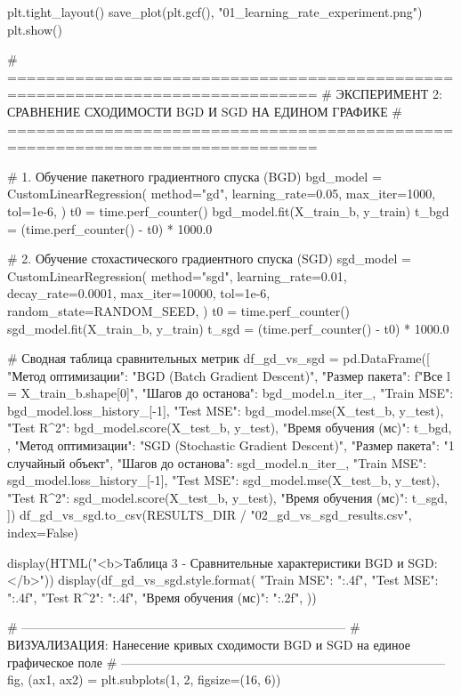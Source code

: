 \documentclass[14pt,a4paper]{extarticle}
\begin{document}
\begin{CodeListing}
plt.tight_layout()
save_plot(plt.gcf(), "01_learning_rate_experiment.png")
plt.show()

# ==============================================================================
# ЭКСПЕРИМЕНТ 2: СРАВНЕНИЕ СХОДИМОСТИ BGD И SGD НА ЕДИНОМ ГРАФИКЕ
# ==============================================================================

# 1. Обучение пакетного градиентного спуска (BGD)
bgd_model = CustomLinearRegression(
    method="gd",
    learning_rate=0.05,
    max_iter=1000,
    tol=1e-6,
)
t0 = time.perf_counter()
bgd_model.fit(X_train_b, y_train)
t_bgd = (time.perf_counter() - t0) * 1000.0

# 2. Обучение стохастического градиентного спуска (SGD)
sgd_model = CustomLinearRegression(
    method="sgd",
    learning_rate=0.01,
    decay_rate=0.0001,
    max_iter=10000,
    tol=1e-6,
    random_state=RANDOM_SEED,
)
t0 = time.perf_counter()
sgd_model.fit(X_train_b, y_train)
t_sgd = (time.perf_counter() - t0) * 1000.0

# Сводная таблица сравнительных метрик
df_gd_vs_sgd = pd.DataFrame([
    {
        "Метод оптимизации": "BGD (Batch Gradient Descent)",
        "Размер пакета": f"Все l = {X_train_b.shape[0]}",
        "Шагов до останова": bgd_model.n_iter_,
        "Train MSE": bgd_model.loss_history_[-1],
        "Test MSE": bgd_model.mse(X_test_b, y_test),
        "Test R^2": bgd_model.score(X_test_b, y_test),
        "Время обучения (мс)": t_bgd,
    },
    {
        "Метод оптимизации": "SGD (Stochastic Gradient Descent)",
        "Размер пакета": "1 случайный объект",
        "Шагов до останова": sgd_model.n_iter_,
        "Train MSE": sgd_model.loss_history_[-1],
        "Test MSE": sgd_model.mse(X_test_b, y_test),
        "Test R^2": sgd_model.score(X_test_b, y_test),
        "Время обучения (мс)": t_sgd,
    }
])
df_gd_vs_sgd.to_csv(RESULTS_DIR / "02_gd_vs_sgd_results.csv", index=False)

display(HTML("<b>Таблица 3 - Сравнительные характеристики BGD и SGD:</b>"))
display(df_gd_vs_sgd.style.format({
    "Train MSE": "{:.4f}",
    "Test MSE": "{:.4f}",
    "Test R^2": "{:.4f}",
    "Время обучения (мс)": "{:.2f}",
}))

# ------------------------------------------------------------------------------
# ВИЗУАЛИЗАЦИЯ: Нанесение кривых сходимости BGD и SGD на единое графическое поле
# ------------------------------------------------------------------------------
fig, (ax1, ax2) = plt.subplots(1, 2, figsize=(16, 6))


\end{CodeListing}
\end{document}
